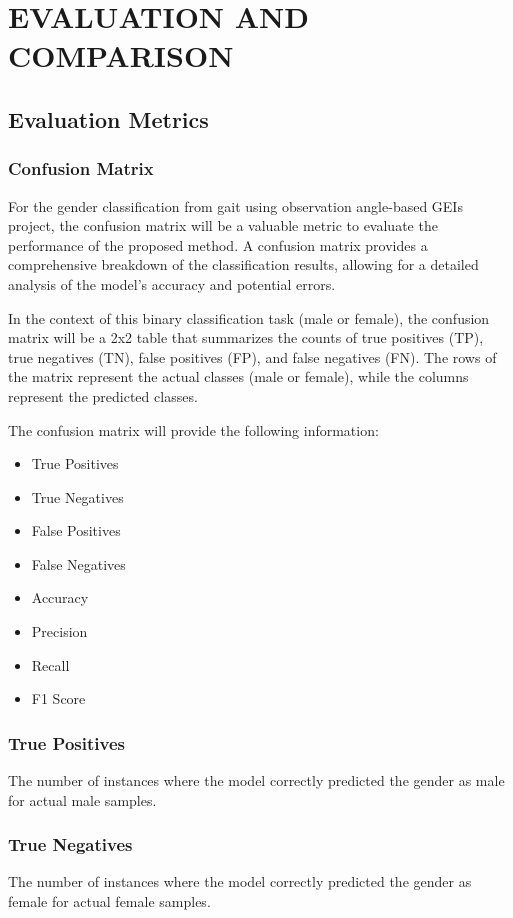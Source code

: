 \chapter{EVALUATION AND COMPARISON}
\graphicspath{{Chapter4/}}

\section{Evaluation Metrics}
\subsection{Confusion Matrix}
For the gender classification from gait using observation angle-based GEIs project, the confusion matrix will be a valuable metric to evaluate the performance of the proposed method. A confusion matrix provides a comprehensive breakdown of the classification results, allowing for a detailed analysis of the model's accuracy and potential errors.

In the context of this binary classification task (male or female), the confusion matrix will be a 2x2 table that summarizes the counts of true positives (TP), true negatives (TN), false positives (FP), and false negatives (FN). The rows of the matrix represent the actual classes (male or female), while the columns represent the predicted classes.

The confusion matrix will provide the following information:
\begin{itemize}
    \item True Positives
    \item True Negatives
    \item False Positives
    \item False Negatives
    \item Accuracy
    \item Precision
    \item Recall
    \item F1 Score
\end{itemize}
\subsection{True Positives}
The number of instances where the model correctly predicted the gender as male for actual male samples.

\subsection{True Negatives}
The number of instances where the model correctly predicted the gender as female for actual female samples.

